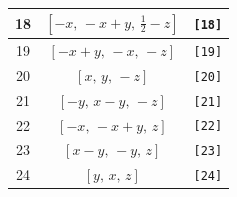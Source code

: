 \documentclass[fleqn,8pt]{jsarticle}
\begin{document}
\begin{longtable}{ccc}
18 & $\left[ - x,\, - x + y,\, \frac{1}{2} - z \right]$ & {\tt [18]} \\ \hline
19 & $\left[ - x + y,\, - x,\, - z \right]$ & {\tt [19]} \\ \hline
20 & $\left[ x,\, y,\, - z \right]$ & {\tt [20]} \\ \hline
21 & $\left[ - y,\, x - y,\, - z \right]$ & {\tt [21]} \\ \hline
22 & $\left[ - x,\, - x + y,\, z \right]$ & {\tt [22]} \\ \hline
23 & $\left[ x - y,\, - y,\, z \right]$ & {\tt [23]} \\ \hline
24 & $\left[ y,\, x,\, z \right]$ & {\tt [24]} \\
\end{longtable}
\end{document}
